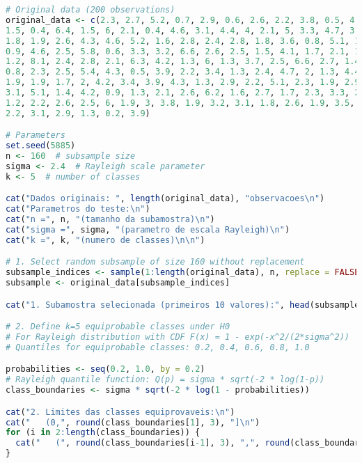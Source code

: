 \documentclass[11pt,a4paper]{article}
\begin{document}
\begin{lstlisting}[language=R]
# Original data (200 observations)
original_data <- c(2.3, 2.7, 5.2, 0.7, 2.9, 0.6, 2.6, 2.2, 3.8, 0.5, 4.9, 5.4, 3.7, 0.4, 4, 3.6, 2, 0.8, 2.5, 2.8, 1.7, 3.3,
1.5, 0.4, 6.4, 1.5, 6, 2.1, 0.4, 4.6, 3.1, 4.4, 4, 2.1, 5, 3.3, 4.7, 3.4, 4.3, 4.5, 2.3, 0.5, 4.9, 3.5,
1.8, 1.9, 2.6, 4.3, 4.6, 5.2, 1.6, 2.8, 2.4, 2.8, 1.8, 3.6, 0.8, 5.1, 1.4, 3.2, 1, 6.3, 3.6, 3.6, 1.8,
0.9, 4.6, 2.5, 5.8, 0.6, 3.3, 3.2, 6.6, 2.6, 2.5, 1.5, 4.1, 1.7, 2.1, 1.5, 0.4, 4.8, 0.4, 1.5, 4.2, 3.3,
1.2, 8.1, 2.4, 2.8, 2.1, 6.3, 4.2, 1.3, 6, 1.3, 3.7, 2.5, 6.6, 2.7, 1.4, 2, 0.7, 4.3, 3.4, 4.3, 4, 4,
0.8, 2.3, 2.5, 5.4, 4.3, 0.5, 3.9, 2.2, 3.4, 1.3, 2.4, 4.7, 2, 1.3, 4.4, 2.9, 2.1, 2.5, 1.6, 2.3, 4.4,
1.9, 1.9, 1.7, 2, 4.2, 3.4, 3.9, 4.3, 1.3, 2.9, 2.2, 5.1, 2.3, 1.9, 2.9, 5.2, 3.4, 2.6, 2.4, 3.2, 1.3,
3.1, 5.1, 1.4, 4.2, 0.9, 1.3, 2.1, 2.6, 6.2, 1.6, 2.7, 1.7, 2.3, 3.3, 2.8, 1.2, 2.6, 1.5, 2, 2.8, 2.5, 2,
1.2, 2.2, 2.6, 2.5, 6, 1.9, 3, 3.8, 1.9, 3.2, 3.1, 1.8, 2.6, 1.9, 3.5, 3.7, 1.8, 2.2, 2, 1.3, 2, 1.1,
2.2, 3.1, 2.9, 1.3, 0.2, 3.9)

# Parameters
set.seed(5885)
n <- 160  # subsample size
sigma <- 2.4  # Rayleigh scale parameter
k <- 5  # number of classes

cat("Dados originais: ", length(original_data), "observacoes\n")
cat("Parametros do teste:\n")
cat("n =", n, "(tamanho da subamostra)\n")
cat("sigma =", sigma, "(parametro de escala Rayleigh)\n")
cat("k =", k, "(numero de classes)\n\n")

# 1. Select random subsample of size 160 without replacement
subsample_indices <- sample(1:length(original_data), n, replace = FALSE)
subsample <- original_data[subsample_indices]

cat("1. Subamostra selecionada (primeiros 10 valores):", head(subsample, 10), "...\n")

# 2. Define k=5 equiprobable classes under H0
# For Rayleigh distribution with CDF F(x) = 1 - exp(-x^2/(2*sigma^2))
# Quantiles for equiprobable classes: 0.2, 0.4, 0.6, 0.8, 1.0

probabilities <- seq(0.2, 1.0, by = 0.2)
# Rayleigh quantile function: Q(p) = sigma * sqrt(-2 * log(1-p))
class_boundaries <- sigma * sqrt(-2 * log(1 - probabilities))

cat("2. Limites das classes equiprovaveis:\n")
cat("   (0,", round(class_boundaries[1], 3), "]\n")
for (i in 2:length(class_boundaries)) {
  cat("   (", round(class_boundaries[i-1], 3), ",", round(class_boundaries[i], 3), "]\n")
}


\end{lstlisting}
\end{document}
